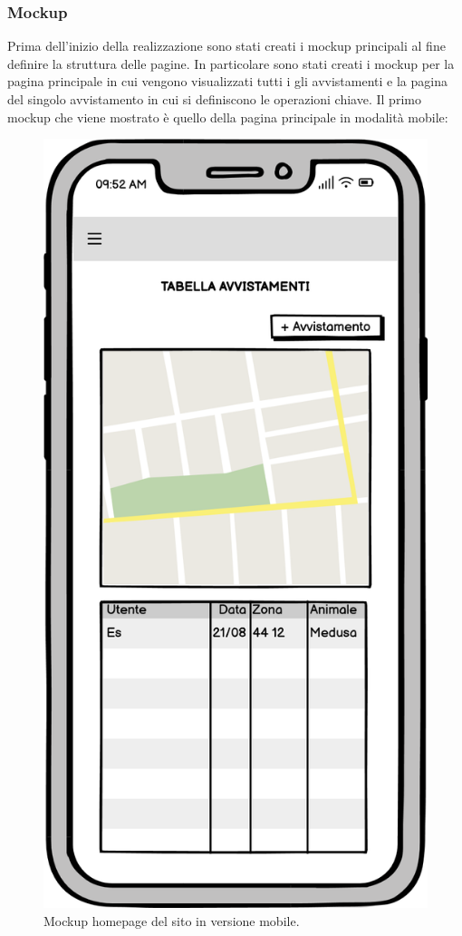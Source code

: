 \documentclass[a4paper,final,12pt]{report}
\begin{document}
\subsubsection{Mockup}
Prima dell'inizio della realizzazione sono stati creati i mockup principali al fine definire la struttura delle pagine. In particolare sono stati creati i mockup per la pagina principale in cui vengono visualizzati tutti i gli avvistamenti e la pagina del singolo avvistamento in cui si definiscono le operazioni chiave.
Il primo mockup che viene mostrato è quello della pagina principale in modalità mobile:
\begin{figure}[hbtp]
\centering
\includegraphics[scale=0.43]{img_concettuale/HomeMob.png}
\caption{Mockup homepage del sito in versione mobile.}
\end{figure}
\end{document}
